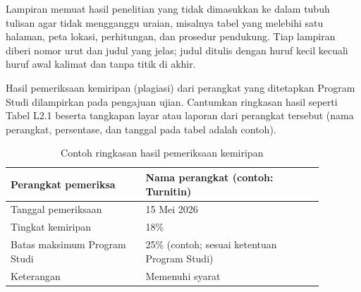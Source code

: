 Lampiran memuat hasil penelitian yang tidak dimasukkan ke dalam tubuh tulisan agar tidak mengganggu uraian, misalnya tabel yang melebihi satu halaman, peta lokasi, perhitungan, dan prosedur pendukung. Tiap lampiran diberi nomor urut dan judul yang jelas; judul ditulis dengan huruf kecil kecuali huruf awal kalimat dan tanpa titik di akhir.

Hasil pemeriksaan kemiripan (plagiasi) dari perangkat yang ditetapkan Program Studi dilampirkan pada pengajuan ujian. Cantumkan ringkasan hasil seperti Tabel L2.1 beserta tangkapan layar atau laporan dari perangkat tersebut (nama perangkat, persentase, dan tanggal pada tabel adalah contoh).

\begin{singlespace}
\begin{longtable}{|p{0.38\linewidth}|p{0.50\linewidth}|}
\caption{Contoh ringkasan hasil pemeriksaan kemiripan}\\
\hline
Perangkat pemeriksa & Nama perangkat (contoh: Turnitin) \\
\hline
Tanggal pemeriksaan & 15 Mei 2026 \\
\hline
Tingkat kemiripan & 18\% \\
\hline
Batas maksimum Program Studi & 25\% (contoh; sesuai ketentuan Program Studi) \\
\hline
Keterangan & Memenuhi syarat \\
\hline
\end{longtable}
\end{singlespace}
